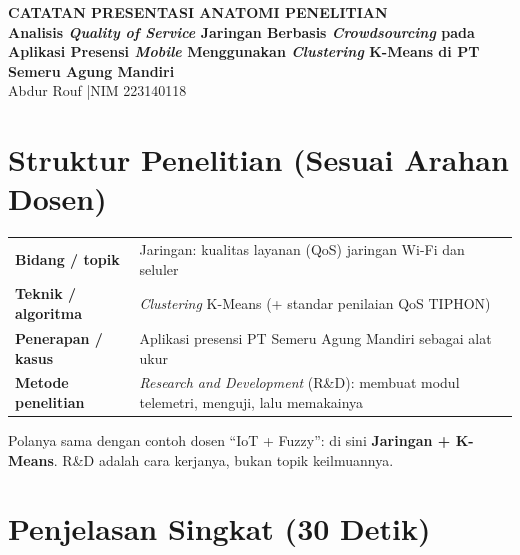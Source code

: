 \documentclass[11pt,a4paper]{article}
\begin{document}
\begin{center}
{\Large\bfseries\color{head} CATATAN PRESENTASI ANATOMI PENELITIAN}\\[5pt]
{\bfseries Analisis \textit{Quality of Service} Jaringan Berbasis \textit{Crowdsourcing} pada Aplikasi Presensi \textit{Mobile} Menggunakan \textit{Clustering} K-Means di PT Semeru Agung Mandiri}\\[6pt]
Abdur Rouf \quad|\quad NIM 223140118
\end{center}

\section{Struktur Penelitian (Sesuai Arahan Dosen)}
\begin{tabular}{@{}lp{11.5cm}@{}}
\textbf{Bidang / topik} & Jaringan: kualitas layanan (QoS) jaringan Wi-Fi dan seluler\\
\textbf{Teknik / algoritma} & \textit{Clustering} K-Means (+ standar penilaian QoS TIPHON)\\
\textbf{Penerapan / kasus} & Aplikasi presensi PT Semeru Agung Mandiri sebagai alat ukur\\
\textbf{Metode penelitian} & \textit{Research and Development} (R\&D): membuat modul telemetri, menguji, lalu memakainya\\
\end{tabular}

Polanya sama dengan contoh dosen ``IoT + Fuzzy'': di sini \textbf{Jaringan + K-Means}. R\&D adalah cara kerjanya, bukan topik keilmuannya.

\section{Penjelasan Singkat (30 Detik)}
\end{document}
